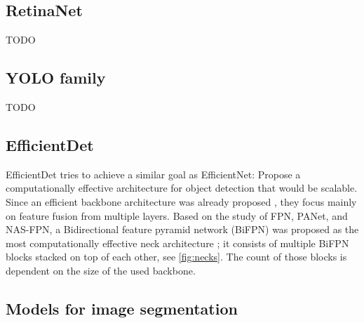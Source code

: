 \subsection{RetinaNet}
TODO

\subsection{YOLO family}
TODO

\subsection{EfficientDet}
EfficientDet tries to achieve a similar goal as EfficientNet: Propose a computationally effective architecture for object detection that would be scalable. Since an efficient backbone architecture was already proposed \cite{Tan2019a}, they focus mainly on feature fusion from multiple layers. Based on the study of FPN, PANet, and NAS-FPN, a Bidirectional feature pyramid network (BiFPN) was proposed as the most computationally effective neck architecture \cite{Tan2019}; it consists of multiple BiFPN blocks stacked on top of each other, see \ref{fig:necks}. The count of those blocks is dependent on the size of the used backbone.

\subsection{Models for image segmentation}
